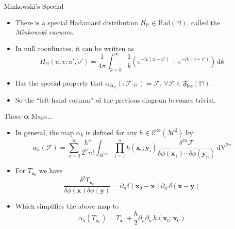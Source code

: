 \documentclass[pdf, fleqn, compress, handout]{beamer}
\newcommand{\nord}[1]{\boldsymbol{:}\!#1\!\boldsymbol{:}}
\newcommand{\mathsterm}[1]{{\itshape\color{dark-teal!80}#1}}
\begin{document}
\begin{frame}{Minkowski's Special}
	\begin{itemize}
		\item	There is a special Hadamard distribution
				$H_\mathbb{M} \in \mathrm{Had}(\mathbb{M})$,
				called the \mathsterm{Minkowski vacuum}.
		\item   In null coordinates, it can be written as
				\begin{equation*}
					H_\mathbb{M}(u, v; u', v')
						=
					\frac{1}{4 \pi}
					\int_{k = 0}^\infty
						\frac{1}{k}
						\left( 
							e^{-ik(u - u')} +
							e^{-ik(v - v')}
						\right)
					\, \mathrm{d}k
				\end{equation*}
		\item	Has the special property that
				$
					\alpha_{H_\mathbb{M}}\left(
						\nord{\mathcal{F}}_\mathbb{M}
					\right)
						=
					\mathcal{F}
				$,
				$
					\forall \mathcal{F}
						\in
					\mathfrak{F}_\mathrm{loc}(\mathbb{M})
				$.
		\item   So the ``left-hand column'' of the previous diagram
				becomes trivial.
	\end{itemize}
\end{frame}

\begin{frame}{Those $\boldsymbol{\alpha}$ Maps...}
	\begin{itemize}
		\item	In general, the map $\alpha_h$ is defined for any
				$h \in \mathcal{C}^\infty(\mathcal{M}^2)$ by
				\begin{equation*}
					\mathcal{\alpha}_h(\mathcal{F})
						=
					\sum_{n = 0}^\infty
						\frac{\hbar^n}{2^n n!}
						\int_{\mathcal{M}^{2n}}
						\prod_{i = 1}^n h(\mathbf{x}_i; \mathbf{y}_i)
						\frac{
								\delta^{2n} \mathcal{F}
							}{
								\delta \phi(\mathbf{x}_1)
									\cdots
								\delta \phi(\mathbf{y}_n)						
							}
						\, \mathrm{dV}^{2n}
				\end{equation*}
		\item	For $T_{\mathbf{x}_0}$ we have
				\begin{equation}
					\frac{
							\delta^2 T_{\mathbf{x}_0}
						}{
							\delta \phi(\mathbf{x})
							\delta \phi(\mathbf{y})
						}
						=
					\partial_u \delta(\mathbf{x}_0 - \mathbf{x})
					\partial_{u'} \delta(\mathbf{x} - \mathbf{y})
				\end{equation}
		\item   Which simplifies the above map to
				\begin{equation}
					\alpha_h(T_{\mathbf{x}_0})
						=
					T_{\mathbf{x}_0}
						+
					\frac{\hbar}{2}
					\partial_u \partial_{u'}
					h(\mathbf{x}_0; \mathbf{x}_0)
				\end{equation}
	\end{itemize}
\end{frame}
\end{document}
